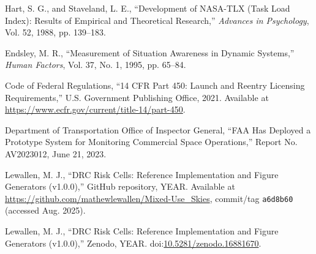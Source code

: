 \documentclass[journal]{new-aiaa}
\newcommand{\repoURL}{https://github.com/mathewlewallen/Mixed-Use_Skies}
\newcommand{\repoCommit}{a6d8b60}
\newcommand{\repoDOI}{10.5281/zenodo.16881670}
\begin{document}
\begin{thebibliography}{99}
 Hart, S. G., and Staveland, L. E., “Development of NASA-TLX (Task Load Index): Results of Empirical and Theoretical Research,” \textit{Advances in Psychology}, Vol. 52, 1988, pp. 139--183.

 Endsley, M. R., “Measurement of Situation Awareness in Dynamic Systems,” \textit{Human Factors}, Vol. 37, No. 1, 1995, pp. 65--84.

 Code of Federal Regulations, “14 CFR Part 450: Launch and Reentry Licensing Requirements,” U.S. Government Publishing Office, 2021. Available at \url{https://www.ecfr.gov/current/title-14/part-450}.

 Department of Transportation Office of Inspector General, “FAA Has Deployed a Prototype System for Monitoring Commercial Space Operations,” Report No. AV2023012, June 21, 2023.

Lewallen, M. J., ``DRC Risk Cells: Reference Implementation and Figure Generators (v1.0.0),'' GitHub repository, YEAR.
Available at \url{\repoURL}, commit/tag \texttt{\repoCommit} (accessed Aug. 2025).

Lewallen, M. J., ``DRC Risk Cells: Reference Implementation and Figure Generators (v1.0.0),'' Zenodo, YEAR.
doi:\href{https://doi.org/\repoDOI}{\repoDOI}.

\end{thebibliography}
\end{document}
